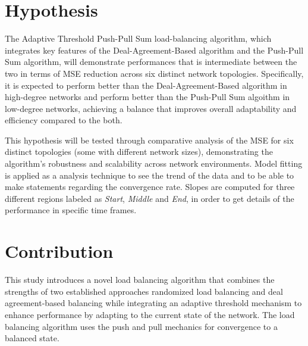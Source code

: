 \section{Hypothesis}\label{sec:hypothesis}
The Adaptive Threshold Push-Pull Sum load-balancing algorithm, which integrates key features of the Deal-Agreement-Based algorithm and the Push-Pull Sum algorithm, will demonstrate performances that is intermediate between the two in terms of MSE reduction across six distinct network topologies. Specifically, it is expected to perform better than the Deal-Agreement-Based algorithm in high-degree networks and perform better than the Push-Pull Sum algoithm in low-degree networks, achieving a balance that improves overall adaptability and efficiency compared to the both.

This hypothesis will be tested through comparative analysis of the MSE for six distinct topologies (some with different network sizes), demonstrating the algorithm's robustness and scalability across network environments. Model fitting is applied as a analysis technique to see the trend of the data and to be able to make statements regarding the convergence rate. Slopes are computed for three different regions labeled as \textit{Start}, \textit{Middle} and \textit{End}, in order to get details of the performance in specific time frames.

\section{Contribution}\label{sec:contribution}
This study introduces a novel load balancing algorithm that combines the strengths of two established approaches randomized load balancing and deal agreement-based balancing while integrating an adaptive threshold mechanism to enhance performance by adapting to the current state of the network. The load balancing algorithm uses the push and pull mechanics for convergence to a balanced state.